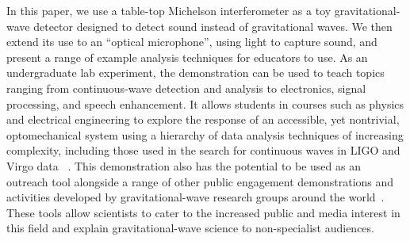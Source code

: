 \documentclass[paper-main.tex]{subfiles}
\begin{document}
In this paper, we use a table-top Michelson interferometer as a toy gravitational-wave detector designed to detect sound instead of gravitational waves. 
We then extend its use to an ``optical microphone'', using light to capture sound, and present a range of example analysis techniques for educators to use. 
As an undergraduate lab experiment, the demonstration can be used to teach topics ranging from continuous-wave detection and analysis to electronics, signal processing, and speech enhancement. 
It allows students in courses such as physics and electrical engineering to explore the response of an accessible, yet nontrivial, optomechanical system using a hierarchy of data analysis techniques of increasing complexity, including those used in the search for continuous waves in LIGO and Virgo data~
\cite{SuvorovaEtAl:2017,SuvorovaEtAl:2016, ScoX1O2Viterbi:2019, ScoX1ViterbiO1:2017, BeniwalEtAl:2021, MillhouseStrangMelatos:2020, JonesSun:2020, MiddletonEtAlO2LMXBs:2020, PostMergerRemnantSearch:2019, BayleyEtAlSOAP:2019, SunEtAlSNR:2018}. 
This demonstration also has the potential to be used as an outreach tool alongside a range of other public engagement demonstrations and activities developed by gravitational-wave research groups around the world~\cite{TTExhibit:2020,CavagliaExhibit:2009, LIGOScienceEducationCentre:online, GravityDiscoveryCentre:online, GWOSC:online, LOSC:2015, LaserLabs:online, SciVR:online, chirp:online, BlackHoleHunter:online, ArthurJeffesMusic:online, GravitySynthLeonTrimble:online}. 
These tools allow scientists to cater to the increased public and media interest in this field and explain gravitational-wave science to non-specialist audiences.
\end{document}
